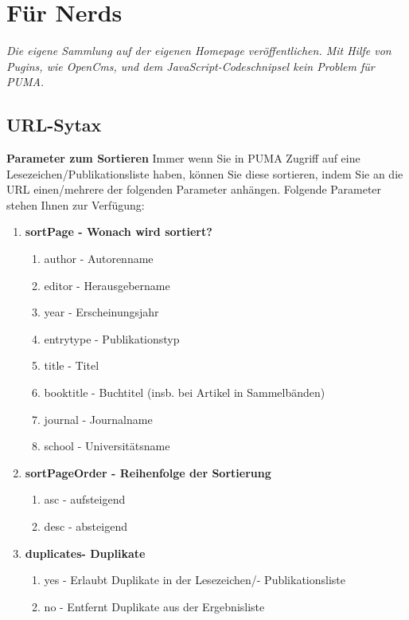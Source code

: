 \section{Für Nerds}
\textit{Die eigene Sammlung auf der eigenen Homepage veröffentlichen. Mit Hilfe von Pugins, wie OpenCms,  und dem JavaScript-Codeschnipsel kein Problem für PUMA.}
\subsection{URL-Sytax}
\textbf{Parameter zum Sortieren} \newline
Immer wenn Sie in PUMA Zugriff auf eine Lesezeichen/Publikationsliste haben, können Sie diese sortieren, indem Sie an die URL einen/mehrere der folgenden Parameter anhängen. Folgende Parameter stehen Ihnen zur Verfügung:
\begin{enumerate}
    \item \textbf{sortPage - Wonach wird sortiert?}
    \begin{enumerate}
        \item author - Autorenname
        \item editor - Herausgebername
        \item year - Erscheinungsjahr
        \item entrytype - Publikationstyp
        \item title - Titel
        \item booktitle - Buchtitel (insb. bei Artikel in Sammelbänden)
        \item journal - Journalname
        \item school - Universitätsname 
    \end{enumerate}
    \item \textbf{sortPageOrder - Reihenfolge der Sortierung}
    \begin{enumerate}
        \item asc - aufsteigend
        \item desc - absteigend 
    \end{enumerate}
    \item \textbf{duplicates- Duplikate}
    \begin{enumerate}
        \item yes - Erlaubt Duplikate in der Lesezeichen/- Publikationsliste
        \item no - Entfernt Duplikate aus der Ergebnisliste
    \end{enumerate}
\end{enumerate}
